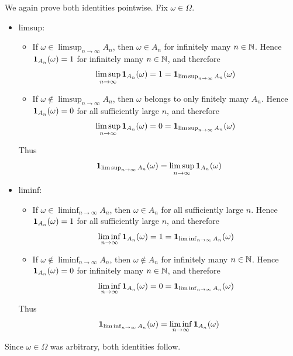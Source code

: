 \begin{solution}
\begin{enumerate}[label={\protect\hyperref[exitem:indicators-limsup-liminf-sets:\arabic*]{(\roman*)}}]
\item \label{solitem:indicators-limsup-liminf-sets:2}
We again prove both identities pointwise.
Fix $\omega \in \Omega$.
\begin{itemize}[leftmargin=*]
\item limsup:
\begin{itemize}[leftmargin=*]
\item
If $\omega \in \limsup_{n \to \infty} A_n$, then $\omega \in A_n$ for infinitely many $n \in \mathbb{N}$.
Hence $\mathbf{1}_{A_n}(\omega)=1$ for infinitely many $n \in \mathbb{N}$, and therefore
\[
\limsup_{n \to \infty}\mathbf{1}_{A_n}(\omega)=1
=
\mathbf{1}_{\limsup_{n \to \infty} A_n}(\omega)
\]
\item
If $\omega \notin \limsup_{n \to \infty} A_n$, then $\omega$ belongs to only finitely many $A_n$.
Hence $\mathbf{1}_{A_n}(\omega)=0$ for all sufficiently large $n$, and therefore
\[
\limsup_{n \to \infty}\mathbf{1}_{A_n}(\omega)=0
=
\mathbf{1}_{\limsup_{n \to \infty} A_n}(\omega)
\]
\end{itemize}
Thus
\[
\mathbf{1}_{\limsup_{n \to \infty} A_n}(\omega)
=
\limsup_{n \to \infty}\mathbf{1}_{A_n}(\omega)
\]

\item liminf:
\begin{itemize}[leftmargin=*]
\item
If $\omega \in \liminf_{n \to \infty} A_n$, then $\omega \in A_n$ for all sufficiently large $n$.
Hence $\mathbf{1}_{A_n}(\omega)=1$ for all sufficiently large $n$, and therefore
\[
\liminf_{n \to \infty}\mathbf{1}_{A_n}(\omega)=1
=
\mathbf{1}_{\liminf_{n \to \infty} A_n}(\omega)
\]
\item
If $\omega \notin \liminf_{n \to \infty} A_n$, then $\omega \notin A_n$ for infinitely many $n \in \mathbb{N}$.
Hence $\mathbf{1}_{A_n}(\omega)=0$ for infinitely many $n \in \mathbb{N}$, and therefore
\[
\liminf_{n \to \infty}\mathbf{1}_{A_n}(\omega)=0
=
\mathbf{1}_{\liminf_{n \to \infty} A_n}(\omega)
\]
\end{itemize}
Thus
\[
\mathbf{1}_{\liminf_{n \to \infty} A_n}(\omega)
=
\liminf_{n \to \infty}\mathbf{1}_{A_n}(\omega)
\]
\end{itemize}
Since $\omega \in \Omega$ was arbitrary, both identities follow.


\end{enumerate}
\end{solution}
